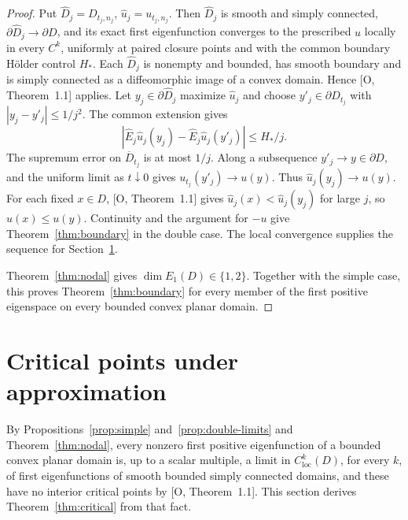 \documentclass[11pt]{article}
\theoremstyle{definition}
\theoremstyle{remark}
\numberwithin{equation}{section}
\begin{document}
\begin{proof}
Put $\widehat D_j=D_{t_j,n_j}$, $\widehat u_j=u_{t_j,n_j}$. Then $\widehat D_j$ is smooth and simply connected, $\partial\widehat D_j\to\partial D$, and its exact first eigenfunction converges to the prescribed $u$ locally in every $C^k$, uniformly at paired closure points and with the common boundary H\"older control $H_*$. Each $\widehat D_j$ is nonempty and bounded, has smooth boundary and is simply connected as a diffeomorphic image of a convex domain. Hence [O, Theorem~1.1] applies. Let $y_j\in\partial\widehat D_j$ maximize $\widehat u_j$ and choose $y'_j\in\partial D_{t_j}$ with $|y_j-y'_j|\le1/j^2$. The common extension gives
\begin{equation}\label{eq:paired-maxima}
|\widehat E_j\widehat u_j(y_j)-\widehat E_j\widehat u_j(y'_j)|\le H_*/j.
\end{equation}
The supremum error on $\overline D_{t_j}$ is at most $1/j$. Along a subsequence $y'_j\to y\in\partial D$, and the uniform limit as $t\downarrow0$ gives $u_{t_j}(y'_j)\to u(y)$. Thus $\widehat u_j(y_j)\to u(y)$. For each fixed $x\in D$, [O, Theorem~1.1] gives $\widehat u_j(x)<\widehat u_j(y_j)$ for large $j$, so $u(x)\le u(y)$. Continuity and the argument for $-u$ give Theorem~\ref{thm:boundary} in the double case. The local convergence supplies the sequence for Section~\ref{sec:critical}.

Theorem~\ref{thm:nodal} gives $\dim E_1(D)\in\{1,2\}$. Together with the simple case, this proves Theorem~\ref{thm:boundary} for every member of the first positive eigenspace on every bounded convex planar domain.
\end{proof}


\section{Critical points under approximation}\label{sec:critical}
By Propositions~\ref{prop:simple} and~\ref{prop:double-limits} and Theorem~\ref{thm:nodal}, every nonzero first positive eigenfunction of a bounded convex planar domain is, up to a scalar multiple, a limit in $C^k_{\mathrm{loc}}(D)$, for every $k$, of first eigenfunctions of smooth bounded simply connected domains, and these have no interior critical points by [O, Theorem~1.1]. This section derives Theorem~\ref{thm:critical} from that fact.
\end{document}
